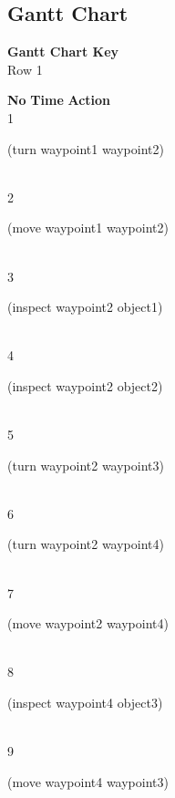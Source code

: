 \documentclass[a4paper,12pt]{article}
\newcommand{\action}[1]{{\sf #1}}
\newcommand{\listrowg}[1]{\begin{minipage}[t]{10cm} #1 \end{minipage}}
\begin{document}
\subsection{Gantt Chart}
{\bf Gantt Chart Key}\\
Row 1
\begin{tabbing}
{\bf No} \qquad \= {\bf Time} \qquad \= {\bf Action} \\
1  \> \listrowg{\action{(turn waypoint1 waypoint2)}} \\
2  \> \listrowg{\action{(move waypoint1 waypoint2)}} \\
3  \> \listrowg{\action{(inspect waypoint2 object1)}} \\
4  \> \listrowg{\action{(inspect waypoint2 object2)}} \\
5  \> \listrowg{\action{(turn waypoint2 waypoint3)}} \\
6  \> \listrowg{\action{(turn waypoint2 waypoint4)}} \\
7  \> \listrowg{\action{(move waypoint2 waypoint4)}} \\
8  \> \listrowg{\action{(inspect waypoint4 object3)}} \\
9  \> \listrowg{\action{(move waypoint4 waypoint3)}} \\
\end{tabbing}
\end{document}
